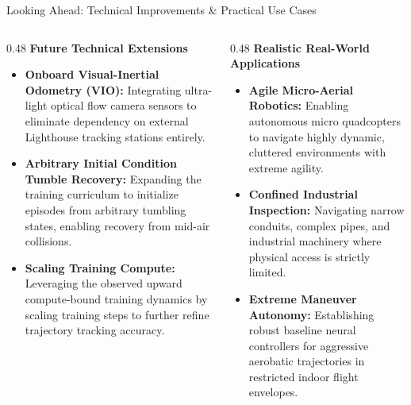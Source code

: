 \documentclass[aspectratio=169,9pt]{beamer}
\begin{document}
\begin{frame}{Looking Ahead: Technical Improvements \& Practical Use Cases}
  \begin{columns}[onlytextwidth,T]
    \begin{column}{0.48\textwidth}
      \textbf{Future Technical Extensions}
      \begin{itemize}\itemsep3pt
        \item \textbf{Onboard Visual-Inertial Odometry (VIO):}
        Integrating ultra-light optical flow camera sensors to eliminate dependency on external Lighthouse tracking stations entirely.
        \item \textbf{Arbitrary Initial Condition Tumble Recovery:}
        Expanding the training curriculum to initialize episodes from arbitrary tumbling states, enabling recovery from mid-air collisions.
        \item \textbf{Scaling Training Compute:}
        Leveraging the observed upward compute-bound training dynamics by scaling training steps to further refine trajectory tracking accuracy.
      \end{itemize}
    \end{column}
    
    \begin{column}{0.48\textwidth}
      \textbf{Realistic Real-World Applications}
      \begin{itemize}\itemsep3pt
        \item \textbf{Agile Micro-Aerial Robotics:}
        Enabling autonomous micro quadcopters to navigate highly dynamic, cluttered environments with extreme agility.
        \item \textbf{Confined Industrial Inspection:}
        Navigating narrow conduits, complex pipes, and industrial machinery where physical access is strictly limited.
        \item \textbf{Extreme Maneuver Autonomy:}
        Establishing robust baseline neural controllers for aggressive aerobatic trajectories in restricted indoor flight envelopes.
      \end{itemize}
    \end{column}
  \end{columns}
\end{frame}
\end{document}
